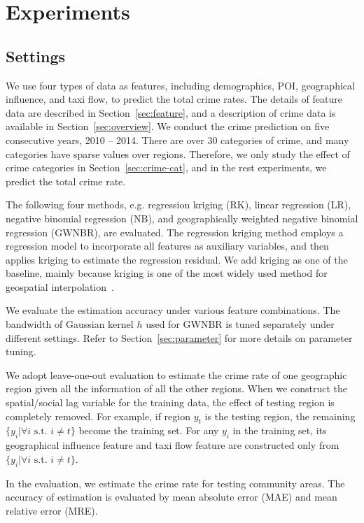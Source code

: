 \section{Experiments}
\label{sec:experiment}


\subsection{Settings}

We use four types of data as features, including demographics, POI, geographical influence, and taxi flow, to predict the total crime rates. The details of feature data are described in Section~\ref{sec:feature}, and a description of crime data is available in Section~\ref{sec:overview}. We conduct the crime prediction on five consecutive years, 2010 -- 2014. There are over 30 categories of crime, and many categories have sparse values over regions. Therefore, we only study the effect of crime categories in Section~\ref{sec:crime-cat}, and in the rest experiments, we predict the total crime rate.

The following four methods, e.g. regression kriging (RK), linear regression (LR), negative binomial regression (NB), and geographically weighted negative binomial regression (GWNBR), are evaluated. The regression kriging method employs a regression model to incorporate all features as auxiliary variables, and then applies kriging to estimate the regression residual. We add kriging as one of the baseline, mainly because kriging is one of the most widely used method for geospatial interpolation~\cite{OlWe90}.

We evaluate the estimation accuracy under various feature combinations. The bandwidth of Gaussian kernel $h$ used for GWNBR is tuned separately under different settings. Refer to Section~\ref{sec:parameter} for more details on parameter tuning.

We adopt leave-one-out evaluation to estimate the crime rate of one geographic region given all the information of all the other regions. When we construct the spatial/social lag variable for the training data, the effect of testing region is completely removed. For example, if region $y_t$ is the testing region, the remaining $\{y_i | \forall i \text{ s.t. } i \neq t\}$ become the training set. For any $y_i$ in the training set, its geographical influence feature and taxi flow feature are constructed only from $\{y_i | \forall i \text{ s.t. } i \neq t\}$.

In the evaluation, we estimate the crime rate for testing community areas. The accuracy of estimation is evaluated by mean absolute error (MAE) and mean relative error (MRE).

